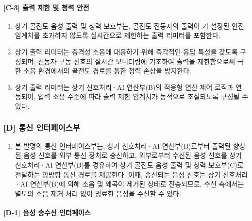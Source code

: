 \documentclass{article}
\begin{document}
\paragraph{[C-3] 출력 제한 및 청력 안전}

\begin{enumerate}[label = \textbf{(C.3.\arabic*)}]

    \item 상기 골전도 음성 출력 및 청력 보호부는, 골전도
    진동자의 출력이 기 설정된 안전 임계치를 초과하지 않도록
    실시간으로 제한하는 출력 리미터를 포함한다.

    \item 상기 출력 리미터는 충격성 소음에 대응하기 위해
    즉각적인 응답 특성을 갖도록 구성되며, 진동자 구동 신호의
    실시간 모니터링에 기초하여 출력을 제한함으로써 극한
    소음 환경에서의 골전도 경로를 통한 청력 손상을 방지한다.

    \item 상기 출력 리미터는 상기 신호처리·AI 연산부(B)의
    적응형 연산 제어 로직과 연동되어, 입력 소음 수준에 따라
    출력 제한 임계치가 동적으로 조절되도록 구성될 수 있다.

\end{enumerate}

\subsubsection{[D] 통신 인터페이스부}

\begin{enumerate}[label = \textbf{(D.\arabic*)}]

    \item 본 발명의 통신 인터페이스부는, 상기 신호처리·AI 연산부(B)로부터 출력된 향상된 음성 신호를 외부 통신 장치로 송신하고, 
    외부로부터 수신된 음성 신호를 상기 신호처리·AI 연산부(B)를 경유하여 상기 골전도 음성 출력 및 청력 보호부(C)로 전달하는 양방향 통신 경로를 제공한다. 
    이때, 송신되는 음성 신호는 상기 신호처리·AI 연산부(B)에 의해 소음 및 왜곡이 제거된 상태로 전송되므로, 수신 측에서는 별도의 소음 제거 처리 없이 명료한 음성을 수신할 수 있다.

\end{enumerate}


\paragraph{[D-1] 음성 송수신 인터페이스}
\end{document}
